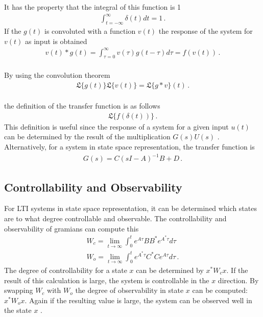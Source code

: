 It has the property that the integral of this function is 1
\begin{gather}
\int_{t = -\infty}^{\infty} \delta(t) dt = 1 \,.
\end{gather}
If the \(g(t)\) is convoluted with a function \(v(t)\) the response of the system for \(v(t)\) as input is obtained \cite{DouglasBb}
\begin{gather}
v(t)*g(t) = \int_{\tau = 0}^{\infty} v(\tau)g(t-\tau)d\tau = f(v(t)) \,.
\end{gather}
 \\
By using the convolution theorem \cite{ABELL2018399}
\begin{gather}
\mathfrak{L}\{g(t)\}\mathfrak{L}\{v(t)\} = \mathfrak{L}\{g*v\}(t) \,.
\end{gather}
\\
the definition of the transfer function is as follows
\begin{gather}
\mathfrak{L}\{f(\delta(t))\} \,.
\end{gather}
This definition is useful since the response of a system for a given input \(u(t)\) can be determined by the result of the multiplication \(G(s)U(s)\) \cite{DouglasBb}.
Alternatively, for a system in state space representation, the transfer function is \cite{BennerGrivet}
\begin{gather}
G(s) = C(sI-A)^{-1}B+D \,. \label{tf-from-ss}
\end{gather}


\subsection{Controllability and Observability}
For LTI systems in state space representation, it can be determined which states are to what degree controllable and observable.
The controllability and observability of gramians can compute this
\begin{gather}
W_c = \lim_{t \to \infty} \int_{0}^{t} e^{A\tau}BB^{*}e^{A^{*}\tau}d\tau \label{gram-ctrl}\\
W_o = \lim_{t \to \infty} \int_{0}^{t} e^{A^{*}\tau}C^{*}Ce^{A\tau}d\tau \,. \label{gram-obsv}
\end{gather}
The degree of controllability for a state \(x\) can be determined by \(x^{*}W_cx\).
If the result of this calculation is large, the system is controllable in the \(x\) direction.
By swapping \(W_c\) with \(W_o\) the degree of observability in state \(x\) can be computed: \(x^{*}W_ox\).
Again if the resulting value is large, the system can be observed well in the state \(x\) \cite{brunton_kutz_2019d}.

